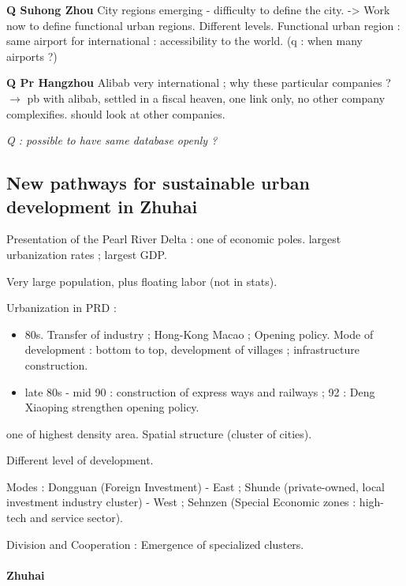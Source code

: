 \textbf{Q Suhong Zhou} City regions emerging - difficulty to define the city. -> Work now to define functional urban regions. Different levels. Functional urban region : same airport for international : accessibility to the world. (q : when many airports ?)

\textbf{Q Pr Hangzhou} Alibab very international ; why these particular companies ? $\rightarrow$ pb with alibab, settled in a fiscal heaven, one link only, no other company complexifies. should look at other companies.








\textit{Q : possible to have same database openly ?}







\subsection*{New pathways for sustainable urban development in Zhuhai}



Presentation of the Pearl River Delta : one of economic poles. largest urbanization rates ; largest GDP.

Very large population, plus floating labor (not in stats).

Urbanization in PRD :
\begin{itemize}
\item 80s. Transfer of industry ; Hong-Kong Macao ; Opening policy. Mode of development : bottom to top, development of villages ; infrastructure construction.
\item late 80s - mid 90 : construction of express ways and railways ; 92 : Deng Xiaoping strengthen opening policy.
\end{itemize}

one of highest density area. Spatial structure (cluster of cities).

Different level of development.

Modes : Dongguan (Foreign Investment) - East ; Shunde (private-owned, local investment industry cluster) - West ; Sehnzen (Special Economic zones : high-tech and service sector).


Division and Cooperation : Emergence of specialized clusters.


\paragraph{Zhuhai}

